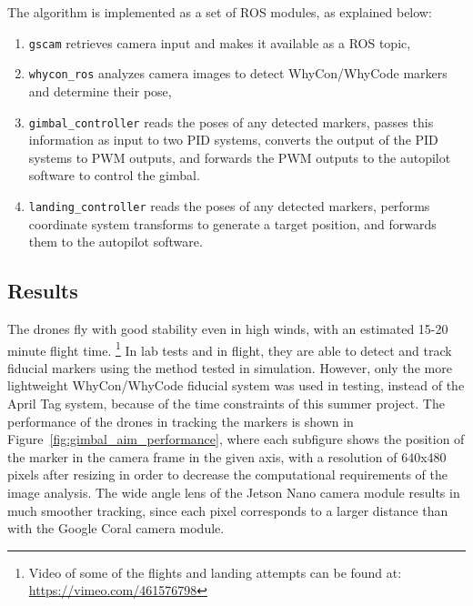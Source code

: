 The algorithm is implemented as a set of ROS modules, as explained below:
\begin{enumerate}
    \item \texttt{gscam} retrieves camera input and makes it available as a ROS topic,
    \item \texttt{whycon\_ros} analyzes camera images to detect WhyCon/WhyCode markers and determine their pose,
    \item \texttt{gimbal\_controller} reads the poses of any detected markers,
                                      passes this information as input to two PID systems,
                                      converts the output of the PID systems to PWM outputs,
                                      and forwards the PWM outputs to the autopilot software to control the gimbal.
    \item \texttt{landing\_controller} reads the poses of any detected markers,
                                        performs coordinate system transforms to generate a target position,
                                        and forwards them to the autopilot software.
\end{enumerate}

\subsection{Results}

The drones fly with good stability even in high winds, with an estimated 15-20 minute flight time.
\footnote{Video of some of the flights and landing attempts can be found at:
\href{https://vimeo.com/461576798}{https://vimeo.com/461576798}}
In lab tests and in flight, they are able to detect and track fiducial markers using the method
tested in simulation.
However, only the more lightweight WhyCon/WhyCode fiducial system was used in testing, instead of the
April Tag system, because of the time constraints of this summer project.
The performance of the drones in tracking the markers is shown in Figure~\ref{fig:gimbal_aim_performance},
where each subfigure shows the position of the marker in the camera frame in the given axis,
with a resolution of 640x480 pixels after resizing in order to decrease the computational requirements
of the image analysis.
The wide angle lens of the Jetson Nano camera module results in much smoother tracking,
since each pixel corresponds to a larger distance than with the Google Coral camera module.

